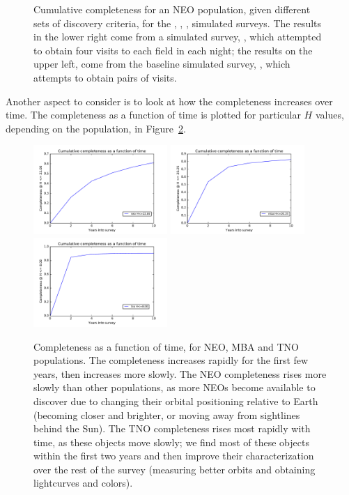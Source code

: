 \begin{figure}
\caption{Cumulative completeness for an NEO population, given
  different sets of discovery criteria, for the , ,
,
 simulated surveys. The results in the
lower right come from a simulated survey, ,
which attempted to obtain four visits to each field in each
night; the results on the upper left, come from the baseline simulated
survey, , which attempts to obtain pairs of
visits.
\label{completeness_changes}}
\end{figure}

Another aspect to consider is to look at how the completeness
increases over time. The completeness as a function of time is plotted
for particular $H$ values, depending on the
population, in Figure~\ref{completeness_time}.

\begin{figure}
\includegraphics[width=2in]{figs/solarsystem/minion_1016_neo_CompletenessOverTime_22_time}
\includegraphics[width=2in]{figs/solarsystem/minion_1016_mba_CompletenessOverTime_20_time}
\includegraphics[width=2in]{figs/solarsystem/minion_1016_tno_CompletenessOverTime_8_time}
\caption{Completeness as a function of time, for NEO, MBA and TNO
  populations. The completeness increases rapidly for the first few
  years, then increases more slowly. The NEO completeness rises more
  slowly than other populations, as more NEOs become available to
  discover due to changing their orbital positioning relative to Earth
  (becoming closer and brighter, or moving away from sightlines behind
  the Sun). The TNO completeness rises most rapidly with time, as
  these objects move slowly; we find most of these objects within the
  first two years and then improve their characterization over the
  rest of the survey (measuring better orbits and obtaining
  lightcurves and colors).
\label{completeness_time}}
\end{figure}

